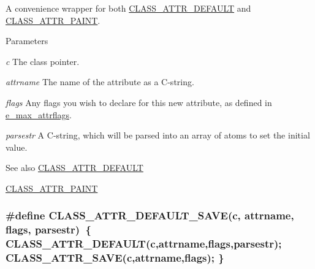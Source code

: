 A convenience wrapper for both \hyperlink{group__attr_ga91196b43f49d6769e6fe2df99f5c7c77}{CLASS\_\-ATTR\_\-DEFAULT} and \hyperlink{group__attr_gaee847156d2c156b4c9f73652b6059500}{CLASS\_\-ATTR\_\-PAINT}. 
\begin{DoxyParams}{Parameters}
\item[{\em c}]The class pointer. \item[{\em attrname}]The name of the attribute as a C-\/string. \item[{\em flags}]Any flags you wish to declare for this new attribute, as defined in \hyperlink{group__attr_gaf296cfc6741bb19207f6ed8062809115}{e\_\-max\_\-attrflags}. \item[{\em parsestr}]A C-\/string, which will be parsed into an array of atoms to set the initial value. \end{DoxyParams}
\begin{DoxySeeAlso}{See also}
\hyperlink{group__attr_ga91196b43f49d6769e6fe2df99f5c7c77}{CLASS\_\-ATTR\_\-DEFAULT} 

\hyperlink{group__attr_gaee847156d2c156b4c9f73652b6059500}{CLASS\_\-ATTR\_\-PAINT} 
\end{DoxySeeAlso}
\hypertarget{group__attr_gae34187cee29d0508d00c725ba33c091a}{
\subsubsection[{CLASS\_\-ATTR\_\-DEFAULT\_\-SAVE}]{\setlength{\rightskip}{0pt plus 5cm}\#define CLASS\_\-ATTR\_\-DEFAULT\_\-SAVE(c, \/  attrname, \/  flags, \/  parsestr)~\{ CLASS\_\-ATTR\_\-DEFAULT(c,attrname,flags,parsestr); CLASS\_\-ATTR\_\-SAVE(c,attrname,flags); \}}}
\label{group__attr_gae34187cee29d0508d00c725ba33c091a}


